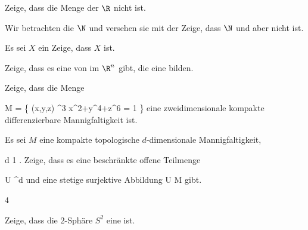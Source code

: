 {}
{

Zeige, dass die Menge der
 $\R$ nicht
 ist.

}
{} {}

{}
{

Wir betrachten die
$\N$ und versehen sie mit der
Zeige, dass $\N$
und
aber nicht
ist.

}
{} {}

{}
{

Es sei $X$ ein
Zeige, dass $X$
ist.

}
{} {}

{}
{

Zeige, dass es eine
von
im $\R^n$ gibt, die eine
bilden.

}
{} {}

{}
{

Zeige, dass die Menge

\mavergleichskettedisp
{\vergleichskette
{ M
}
{ =} { \left\{ (x,y,z) \in \R^3  \mid   x^2+y^4+z^6 = 1        \right\}
}
{ } {
}
{ } {
}
{ } {
}
}
{}{}{}
eine zweidimensionale kompakte differenzierbare Mannigfaltigkeit ist.

}
{} {}

{}
{

Es sei $M$ eine kompakte topologische $d$-dimensionale Mannigfaltigkeit,

\mavergleichskette
{\vergleichskette
{ d
}
{ \geq }{ 1
}
{  }{
}
{    }{
}
{   }{
}
}
{}{}{.}
Zeige, dass es eine beschränkte offene Teilmenge

\mavergleichskette
{\vergleichskette
{ U
}
{ \subseteq }{ \R^d
}
{  }{
}
{    }{
}
{   }{
}
}
{}{}{}
und eine stetige surjektive Abbildung
\maabbdisp {\varphi} { U } { M
} {}
gibt.

}
{} {}


{4}
{

Zeige, dass die $2$-Sphäre $S^2$ eine
ist.

}
{} {}

